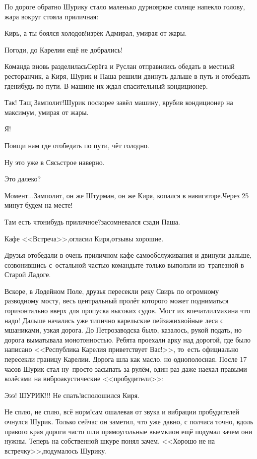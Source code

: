 По дороге обратно Шурику стало маленько дурно\mdash яркое солнце напекло голову, жара вокруг стояла приличная:

\diagdash Кирь, а ты боялся холодов!\mdash изрёк Адмирал, умирая от жары.

\diagdash Погоди, до Карелии ещё не добрались!

Команда вновь разделилась\mdash Серёга и Руслан отправились обедать в местный ресторанчик, а Киря, Шурик и Паша решили двинуть дальше в путь и отобедать где\sdash нибудь по пути. В машине их ждал спасительный кондиционер.

\diagdash Так! Тащ Замполит!\mdash Шурик поскорее завёл машину, врубив кондиционер на максимум, умирая от жары.

\diagdash Я!

\diagdash Поищи нам где отобедать по пути, чёт голодно.

\diagdash Ну это уже в Сясьстрое наверно.

\diagdash Это далеко?

\diagdash Момент$\ldots$\mdash Замполит, он же Штурман, он же Киря, копался в навигаторе.\mdash Через 25 минут будем на месте!

\diagdash Там есть что\sdash нибудь приличное?\mdash засомневался сзади Паша.

\diagdash Кафе <<Встреча>>,\mdash огласил Киря,\mdash отзывы хорошие.

Друзья отобедали в очень приличном кафе самообслуживания и двинули дальше, созвонившись с~остальной частью команды\mdash те только выползли из~трапезной в Старой Ладоге. 

Вскоре, в Лодейном Поле, друзья пересекли реку Свирь по огромному разводному мосту, весь центральный пролёт которого может подниматься горизонтально вверх для пропуска высоких судов. Мост их впечатлил\mdash махина что надо! Дальше начались уже типично карельские пейзажи\mdash хвойные леса с мшаниками, узкая дорога. До Петрозаводска было, казалось, рукой подать, но дорога выматывала монотонностью. Ребята проехали арку над дорогой, где было написано <<Республика Карелия приветствует Вас!>>, то~есть официально пересекли границу Карелии. Дорога шла как масло, но однополосная. После 17 часов Шурик стал ну~просто засыпать за рулём, один раз даже наехал правыми колёсами на вибро\sdash акустические <<пробудители>>:

\diagdash Э\sdash э\sdash э! ШУРИК!!! Не спать!\mdash всполошился Киря.

\diagdash Не сплю, не сплю, всё норм!\mdash сам ошалевая от звука и вибрации пробудителей очнулся Шурик. Только сейчас он заметил, что уже давно, с полчаса точно, вдоль правого края дороги часто шли прямоугольные выемки\mdash он ещё подумал зачем они нужны. Теперь на собственной шкуре понял зачем. <<Хорошо не на встречку>>,\mdash подумалось Шурику.

